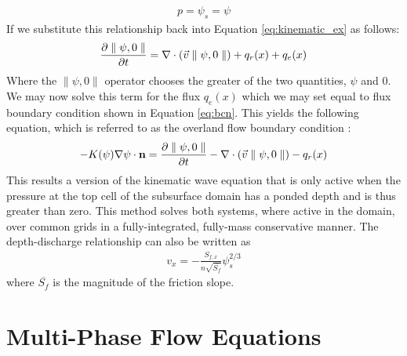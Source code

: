 \begin{eqnarray}
p = \psi_s = \psi
\label{eq:press_cont}
\end{eqnarray}
If we substitute this relationship back into Equation \ref{eq:kinematic_ex} as follows:
\begin{eqnarray}
\frac{\partial \parallel\psi,0\parallel}{\partial t} =
\nabla \cdot ({\vec v} \parallel\psi,0\parallel) + q_r(x) + q_e(x)
\label{eq:OF_BC_ex}
\end{eqnarray}
Where the $\parallel\psi,0\parallel$ operator chooses the greater of the two quantities, $\psi$ and $0$.  We may now solve this term for the flux $q_e(x)$ which we may set equal to flux boundary condition shown in Equation \ref{eq:bcn}.  This yields the following equation, which is referred to as the overland flow boundary condition \cite{KM06}:
\begin{eqnarray}
-K(\psi)\nabla \psi \cdot {\bf n}  = \frac{\partial \parallel\psi,0\parallel}{\partial t} -
\nabla \cdot ({\vec v} \parallel\psi,0\parallel) - q_r(x)
\label{eq:overland_bc}
\end{eqnarray}
This results a version of the kinematic wave equation that is only active when the pressure at the top cell of the subsurface domain has a ponded depth and is thus greater than zero.  This method solves both systems, where active in the domain, over common grids in a fully-integrated, fully-mass conservative manner.
The depth-discharge relationship can also be written as
\begin{eqnarray}
v_x=- \frac{S_{f,x}}{n\sqrt{\overline{S_{f}}}}\psi_{s}^{2/3}
\label{eq:manningsnew}
\end{eqnarray}
where $\overline{S_{f}}$ is the magnitude of the friction slope. 

\section{Multi-Phase Flow Equations}
\label{Multi-Phase Flow Equations}

